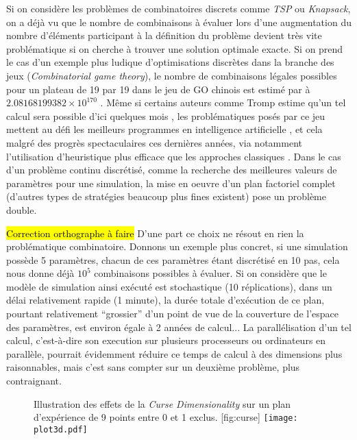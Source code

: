 Si on considère les problèmes de combinatoires discrets comme \textit{TSP} ou \textit{Knapsack}, on a déjà vu que le nombre de combinaisons à évaluer lors d'une augmentation du nombre d'éléments participant à la définition du problème devient très vite problématique si on cherche à trouver une solution optimale exacte. Si on prend le cas d'un exemple plus ludique d'optimisations discrètes dans la branche des jeux (\textit{Combinatorial game theory}), le nombre de combinaisons légales possibles pour un plateau de 19 par 19 dans le jeu de GO chinois est estimé par \textcite{Tromp2007} à $2.08168199382×10^{170}$ . Même si certains auteurs comme Tromp estime qu'un tel calcul sera possible d'ici quelques mois , les problématiques posés par ce jeu mettent au défi les meilleurs programmes en intelligence artificielle \autocite{Bouzi2001}, et cela malgré des progrès spectaculaires ces dernières années, via notamment l'utilisation d'heuristique plus efficace que les approches classiques .  Dans le cas d'un problème continu discrétisé, comme la recherche des meilleures valeurs de paramètres pour une simulation, la mise en oeuvre d'un plan factoriel complet (d'autres types de stratégies beaucoup plus fines existent) pose un problème double.

\hl{Correction orthographe à faire}
D'une part ce choix ne résout en rien la problématique combinatoire. Donnons un exemple plus concret, si une simulation possède 5 paramètres, chacun de ces paramètres étant discrétisé en 10 pas, cela nous donne déjà $10^5$ combinaisons possibles à évaluer. Si on considère que le modèle de simulation ainsi exécuté est stochastique (10 réplications), dans un délai relativement rapide (1 minute), la durée totale d'exécution de ce plan, pourtant relativement \enquote{grossier} d'un point de vue de la couverture de l'espace des paramètres, est environ égale à 2 années de calcul... La parallélisation d'un tel calcul, c'est-à-dire son execution sur plusieurs processeurs ou ordinateurs en parallèle, pourrait évidemment réduire ce temps de calcul à des dimensions plus raisonnables, mais c'est sans compter sur un deuxième problème, plus contraignant.

\begin{figure}[htbp]
	\begin{sidecaption}[fortoc]{Illustration des effets de la \textit{Curse Dimensionality} sur un plan d'expérience de 9 points entre 0 et 1 exclus. }[fig:curse]
	 \centering
	 	\texttt{[image: plot3d.pdf]}
	\end{sidecaption}
\end{figure}

